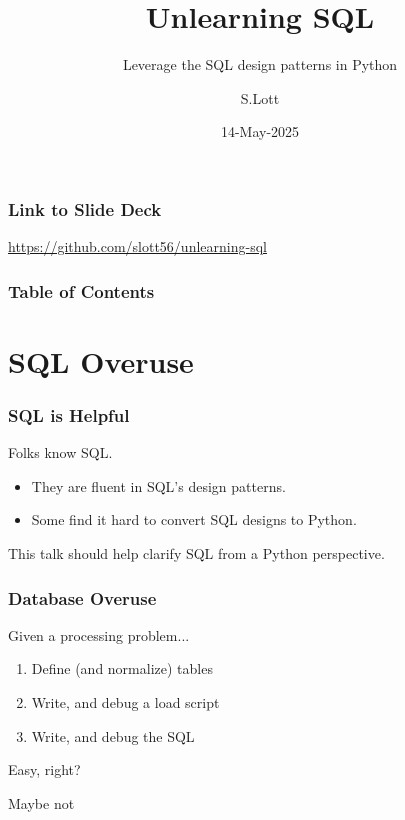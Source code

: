 \documentclass{beamer}
\title{Unlearning SQL}
\subtitle{Leverage the SQL design patterns in Python}
\author{S.Lott}
\institute{\texttt{\underline{https://fosstodon.org/@slott56}}\linebreak{}\texttt{\underline{https://github.com/slott56}}}
\date{14-May-2025}
\begin{document}
\frame{
    \titlepage
}

\begin{frame}
    \frametitle{Link to Slide Deck}
    \hfill
    \underline{https://github.com/slott56/unlearning-sql}
\end{frame}


\begin{frame}
\frametitle{Table of Contents}
\tableofcontents
\end{frame}

\section{SQL Overuse}

\begin{frame}
    \frametitle{SQL is Helpful}

    Folks know SQL.

    \vspace{1em}
    \begin{itemize}

    \item They are fluent in SQL's design patterns.

    \item Some find it hard to convert SQL designs to Python.
    \end{itemize}

    \vspace{1em}
    This talk should help clarify SQL from a Python perspective.
\end{frame}

\begin{frame}
    \frametitle{Database Overuse}

    Given a processing problem...\pause

    \begin{enumerate}
        \item Define (and normalize) tables
        \item Write, and debug a load script
        \item Write, and debug the SQL
    \end{enumerate}

    Easy, right? \pause

    \vspace{1em}
    Maybe not
\end{frame}
\end{document}
